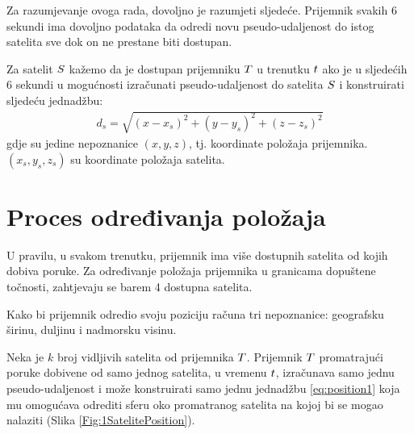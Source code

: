 \documentclass[a4paper,twoside,12pt]{memoir} %
\begin{document}
	Za razumjevanje ovoga rada, dovoljno je razumjeti sljedeće.
	Prijemnik svakih 6 sekundi ima dovoljno podataka da odredi novu pseudo-udaljenost do istog satelita sve dok on ne prestane biti dostupan. 
	
	\begin{defn}
		\label{stranica:dostupnost}
		Za satelit $\mathnormal{S}$ kažemo da je dostupan prijemniku $\mathnormal{T}$ u trenutku $\mathnormal{t}$ ako je u sljedećih 6 sekundi u mogućnosti izračunati
		pseudo-udaljenost do satelita $\mathnormal{S}$ i konstruirati sljedeću jednadžbu:
		\begin{align}\label{eq:position1}
		d_s = \sqrt{(x-x_s)^{2}+(y-y_s)^{2}+(z-z_s)^{2}}
		\end{align}
		gdje su jedine nepoznanice $(x,y,z)$, tj. koordinate položaja prijemnika.
		$(x_s,y_s,z_s)$ su koordinate položaja satelita. 
	\end{defn}
	
	\section{Proces određivanja položaja}\label{sec:positionProcess}
	U pravilu, u svakom trenutku, prijemnik ima više dostupnih satelita od kojih dobiva poruke. Za određivanje položaja prijemnika u granicama dopuštene točnosti,
	zahtjevaju se barem 4 dostupna satelita\label{stranica:4satelita}.
	
	Kako bi prijemnik odredio svoju poziciju računa tri nepoznanice: geografsku širinu, duljinu i nadmorsku visinu.
	
	Neka je $k$ broj vidljivih satelita od prijemnika $\mathnormal{T}$.
	Prijemnik $\mathnormal{T}$ promatrajući poruke dobivene od samo jednog satelita,
	u vremenu $\mathnormal{t}$, izračunava samo jednu pseudo-udaljenost i može konstruirati samo jednu jednadžbu \ref{eq:position1}
	 koja mu omogućava odrediti sferu oko promatranog satelita na kojoj bi se mogao nalaziti (Slika \ref{Fig:1SatelitePosition}).
	
\end{document}
